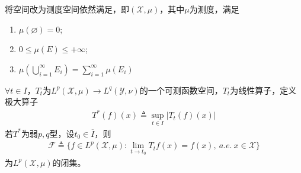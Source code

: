 \begin{Corollary}
    将空间改为测度空间依然满足，即$(\mathscr{X},\mu)$，其中$\mu$为测度，满足
    \begin{enumerate}[leftmargin=1cm, label=\arabic*.]
        \item $\mu(\varnothing) = 0$;
        \item $0\leqslant \mu(E) \leqslant +\infty$;
        \item $\mu(\bigcup\limits_{i=1}^{\infty} E_i) = \sum\limits_{i=1}^{\infty} \mu(E_i)$
    \end{enumerate}
\end{Corollary}

\begin{theorem}
    $\forall t\in I$，$T_t$为$L^p(\mathscr{X},\mu)\to L^q(\mathscr{Y},\nu)$的一个可测函数空间，$T_t$为线性算子，定义极大算子
    \begin{align*}
        T^* (f)(x) \triangleq \sup\limits_{t\in I} |T_t(f)(x)|
    \end{align*}
    若$T^*$为弱$p,q$型，设$t_0\in \overline{I}$，则
    \begin{align*}
        \mathcal{F} \triangleq \{f\in L^p(\mathscr{X},\mu): \lim\limits_{t\to t_0} T_t f(x) = f(x),\ a.e.\ x\in\mathscr{X} \}
    \end{align*}
    为$L^p(\mathscr{X},\mu)$的闭集。
\end{theorem}
